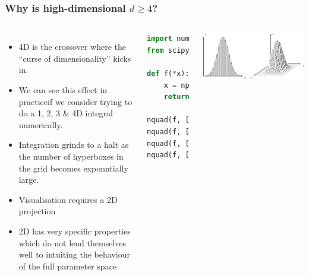 \documentclass[aspectratio=169]{beamer}
\begin{document}
\begin{frame}[fragile]
    \frametitle{Why is high-dimensional $d\ge4$?}
    \begin{columns}
        \begin{itemize}
            \item 4D is the crossover where the ``curse of dimensionality'' kicks in.
            \item We can see this effect in practiceif we consider trying to do a 1, 2, 3 \& 4D integral numerically.
            \item Integration grinds to a halt as the number of hyperboxes in the grid becomes exponntially large.
            \item Visualisation requires a 2D projection
            \item 2D has very specific properties which do not lend themselves well to intuiting the behaviour of the full parameter space
        \end{itemize}
    \begin{lstlisting}[language=Python]
import numpy as np
from scipy.integrate import nquad

def f(*x):
    x = np.array([*x])
    return np.exp(-(x**2).sum())

nquad(f, [[-5, 5]])     # 322  micro s
nquad(f, [[-5, 5]] * 2) # 33.4 ms
nquad(f, [[-5, 5]] * 3) # 3.4  s 
nquad(f, [[-5, 5]] * 4) # ...
    \end{lstlisting}
        \includegraphics[width=\textwidth]{figures/integration.pdf}
    \end{columns}
    
\end{frame}
\end{document}
